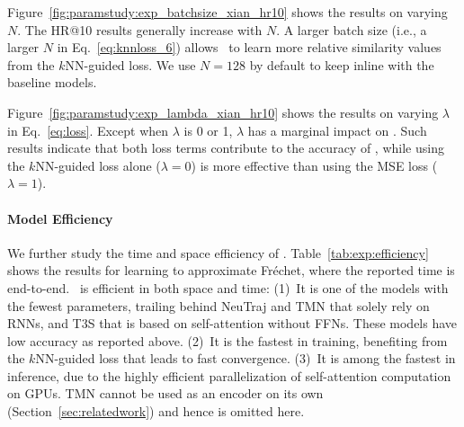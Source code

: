 Figure~\ref{fig:paramstudy:exp_batchsize_xian_hr10} shows the results on varying $N$. The HR@10 results generally increase with $N$. A larger batch size (i.e., a larger $N$ in Eq.~\eqref{eq:knnloss_6}) allows \model\ to learn more relative similarity values from the $k$NN-guided loss.
We use $N = 128$ by default to keep inline with the baseline models.


Figure~\ref{fig:paramstudy:exp_lambda_xian_hr10} shows the results on varying $\lambda$ in Eq.~\eqref{eq:loss}. Except when $\lambda$ is 0 or 1, $\lambda$ has a marginal impact on \model.
Such results indicate that both loss terms contribute to the accuracy of \model, while using the $k$NN-guided loss alone ($\lambda=0$) is more effective than using the MSE loss ($\lambda=1$).

\paragraph{Model Efficiency}
We further study the time and space efficiency of \model.
Table~\ref{tab:exp:efficiency} shows the results for learning to approximate Fr\'echet, where the reported time is end-to-end. 
\model\ is efficient in both space and time: 
(1)~It is one of the models with the fewest parameters, trailing behind NeuTraj and TMN that solely rely on RNNs, and T3S that is based on self-attention without FFNs.
These models have low accuracy as reported above. 
(2)~It is the fastest in training, benefiting from the $k$NN-guided loss that leads to fast convergence.
(3)~It is among the fastest in inference, due to the highly efficient parallelization of self-attention computation on GPUs.
TMN cannot be used as an encoder on its own (Section~\ref{sec:relatedwork}) and hence is omitted here.



